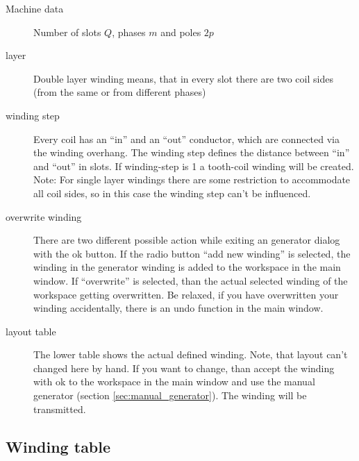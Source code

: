\documentclass[]{scrreprt}
\begin{document}
\begin{description}
 \item[Machine data] Number of slots $Q$, phases $m$ and poles $2p$ 
 \item[layer] Double layer winding means, that in every slot there are two coil sides (from the same
      or from different phases)
 \item[winding step] Every coil has an "`in"' and an "`out"' conductor, which are connected via 
       the winding overhang. The winding step defines the distance between "`in"' and "`out"' in slots.
       If winding-step is 1 a tooth-coil winding will be created. Note: For single layer windings 
       there are some restriction to accommodate all coil sides, so in this case the winding step
       can't be influenced.       
 \item[overwrite winding] There are two different possible action while exiting an generator dialog with
          the ok button. If the radio button "`add new winding"' is selected, the winding in the generator
          winding is added to the workspace in the main window. If "`overwrite"' is selected, than the 
          actual selected winding of the workspace getting overwritten. Be relaxed, if you have overwritten
          your winding accidentally, there is an undo function in the main window.
 \item[layout table] The lower table shows the actual defined winding. Note, that layout can't changed here
          by hand. If you want to change, than accept the winding with ok to the workspace in the main window
          and use the manual generator (section \ref{sec:manual_generator}). The winding will be transmitted.
\end{description}
%
%
\FloatBarrier
\subsection{Winding table}











\end{document}
